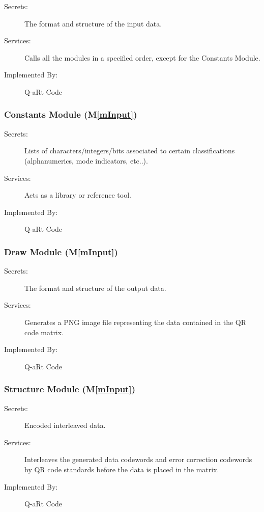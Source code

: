 \documentclass[12pt, titlepage]{article}
\newcommand{\mref}[1]{M\ref{#1}}
\begin{document}
\begin{description}
\item[Secrets:] The format and structure of the input data.
\item[Services:] Calls all the modules in a specified order, except for the Constants Module.
\item[Implemented By:] Q-aRt Code
\end{description}

\subsubsection{Constants Module (\mref{mInput})}

\begin{description}
\item[Secrets:] Lists of characters/integers/bits associated to certain classifications (alphanumerics, mode indicators, etc..).
\item[Services:] Acts as a library or reference tool.
\item[Implemented By:] Q-aRt Code
\end{description}

\subsubsection{Draw Module (\mref{mInput})}

\begin{description}
\item[Secrets:] The format and structure of the output data.
\item[Services:] Generates a PNG image file representing the data contained in the QR code matrix.
\item[Implemented By:] Q-aRt Code
\end{description}

\subsubsection{Structure Module (\mref{mInput})}

\begin{description}
\item[Secrets:] Encoded interleaved data.
\item[Services:] Interleaves the generated data codewords and error correction codewords by QR code standards before the data is placed in the matrix.
\item[Implemented By:] Q-aRt Code
\end{description}
\end{document}
